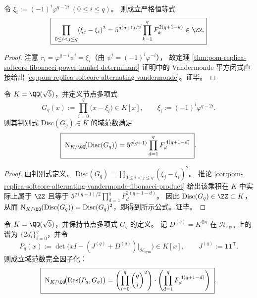 \begin{corollary}\label{cor:pom-replica-softcore-alternating-vandermonde-fibonacci-product}
令
\(
\xi_i:=(-1)^i\varphi^{q-2i}\ (0\le i\le q)
\)。
则成立严格恒等式
\begin{equation}\label{eq:pom-replica-softcore-alternating-vandermonde}
\boxed{\;
\prod_{0\le i<j\le q}(\xi_j-\xi_i)^2
=5^{q(q+1)/2}\prod_{k=1}^{q}F_k^{2(q+1-k)}\in\ZZ.}
\end{equation}
\end{corollary}
\begin{proof}
注意 \(r_i=\varphi^{q-i}\psi^i=\xi_i\)（由 \(\psi^i=(-1)^i\varphi^{-i}\)），
故定理 \ref{thm:pom-replica-softcore-fibonacci-power-hankel-determinant} 证明中的 Vandermonde 平方闭式直接给出 \eqref{eq:pom-replica-softcore-alternating-vandermonde}。证毕。
\end{proof}

\begin{proposition}\label{prop:pom-replica-softcore-node-discriminant-field-norm}
令 \(K=\QQ(\sqrt5)\)，并定义节点多项式
\[
G_q(x):=\prod_{i=0}^{q}\bigl(x-\xi_i\bigr)\in K[x],
\qquad
\xi_i:=(-1)^i\varphi^{q-2i}.
\]
则其判别式 \(\mathrm{Disc}(G_q)\in K\) 的域范数满足
\[
\boxed{\;
\mathrm N_{K/\QQ}\!\bigl(\mathrm{Disc}(G_q)\bigr)
=5^{q(q+1)}\prod_{d=1}^{q}F_d^{\,4(q+1-d)}\; }.
\]
\end{proposition}

\begin{proof}
由判别式定义，
\(
\mathrm{Disc}(G_q)=\prod_{0\le i<j\le q}(\xi_j-\xi_i)^2
\)。
推论 \ref{cor:pom-replica-softcore-alternating-vandermonde-fibonacci-product} 给出该乘积在 \(K\) 中实际上属于 \(\ZZ\) 且等于
\(
5^{q(q+1)/2}\prod_{d=1}^{q}F_d^{2(q+1-d)}
\)。
因此 \(\mathrm{Disc}(G_q)\in\ZZ\subset K\)，从而
\(
\mathrm N_{K/\QQ}(\mathrm{Disc}(G_q))=\mathrm{Disc}(G_q)^2
\)，即得到所示公式。证毕。
\end{proof}

\begin{proposition}\label{prop:pom-replica-softcore-resultant-factorization-field-norm}
令 \(K=\QQ(\sqrt5)\)，并保持节点多项式 \(G_q\) 的定义。
记 \(D^{(q)}=K^{\otimes q}\) 在 \(\mathcal H_{\mathrm{sym}}\) 上的谱为 \(\{2d_i\}_{i=0}^q\)，并令
\[
P_q(x):=\det\!\bigl(xI-(J^{(q)}+D^{(q)})|_{\mathcal H_{\mathrm{sym}}}\bigr)\in K[x],
\qquad
J^{(q)}:=\mathbf{1}\mathbf{1}^{\mathsf T}.
\]
则成立域范数完全因子化：
\[
\boxed{\;
\mathrm N_{K/\QQ}\!\bigl(\mathrm{Res}(P_q,G_q)\bigr)
=\left(\prod_{i=0}^{q}\binom{q}{i}^2\right)\cdot
\left(\prod_{d=1}^{q}F_d^{\,4(q+1-d)}\right)\; }.
\]
\end{proposition}

